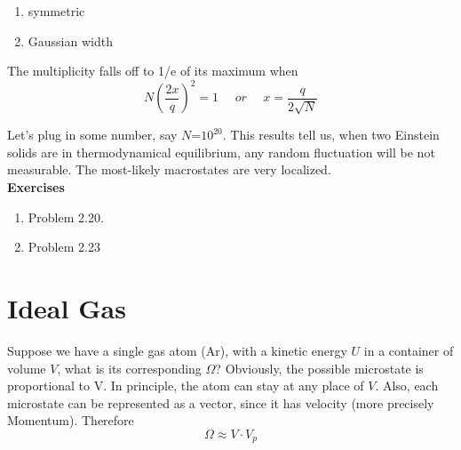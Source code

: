 \begin{enumerate}
\item symmetric
\item Gaussian width
\end{enumerate}



The multiplicity falls off to 1/e of its maximum when 
\begin{equation}
  N(\frac{2x}{q})^2 = 1 ~~~~~~or~~~~~~ x = \frac{q}{2\sqrt{N}}
\end{equation}

Let's plug in some number, say $N$=\textrm {$10^{20}$}. 
This results tell us,
when two Einstein solids are in thermodynamical equilibrium, any random fluctuation
will be not measurable. The most-likely macrostates are very localized.\\
{\bf Exercises}
\begin{enumerate}
\item Problem 2.20. 
\item Problem 2.23
\end{enumerate}

\section{Ideal Gas}
Suppose we have a single gas atom (Ar), with a kinetic energy $U$ in a container of volume $V$, what is its corresponding $\Omega$?
Obviously, the possible microstate is proportional to V. In principle, the atom can stay at any place of $V$.
Also, each microstate can be represented as a vector, since it has velocity (more precisely Momentum). 
Therefore
\begin{equation}
\Omega \approx V\cdot V_p
\end{equation}




